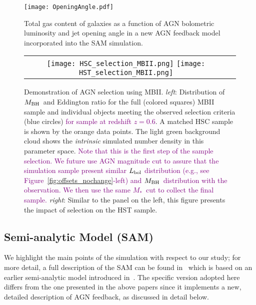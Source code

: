 \documentclass[twocolumn]{aastex631}
\newcommand{\todo}[1]{\textcolor{red}{[{\bf TODO}: #1]}}
\newcommand{\red}[1]{\textcolor{purple}{#1}}
\def\smass{{$M_*$}}
\def\mbh{$M_{\rm BH}$}
\begin{document}
\begin{figure}
\centering
\texttt{[image: OpeningAngle.pdf]}
\caption{\label{fig:SAM} 
Total gas content of galaxies as a function of AGN bolometric luminosity and jet opening angle in a new AGN feedback model incorporated into the SAM simulation.
}
\end{figure} 

\begin{figure*}
\centering
\begin{tabular}{c c}
{\texttt{[image: HSC\_selection\_MBII.png]}}
{\texttt{[image: HST\_selection\_MBII.png]}}
\end{tabular}
\caption{\label{fig:selection}Demonstration of AGN selection using MBII. {\it left}: Distribution of \mbh\ and Eddington ratio for the full (colored squares) MBII sample and individual objects meeting the observed selection criteria (blue circles) \red{for sample at redshift $z=0.6$}. A matched HSC sample is shown by the orange data points. The light green background cloud shows the {\it intrinsic} simulated number density in this parameter space. \red{Note that this is the first  step of the sample selection. We future use AGN magnitude cut to assure that the simulation sample present similar $L_{\rm bol}$ distribution (e.g., see Figure~\ref{fig:offsets_nochange}-left) and \mbh\ distribution with the observation. We then use the same \smass\ cut to collect the final sample.}
{\it right}: Similar to the panel on the left, this figure presents the impact of selection on the HST sample.
}
\end{figure*}

\subsection{Semi-analytic Model (SAM)}\label{subsec:SAM}
We highlight the main points of the simulation with respect to our study; for more detail, a full description of the SAM can be found in~\citet{Menci2016} which is based on an earlier semi-analytic model introduced in~\citet{Menci2014}. The specific version adopted here differs from the one presented in the above papers since it implements a new, detailed description of AGN feedback, as discussed in detail below.
\end{document}

